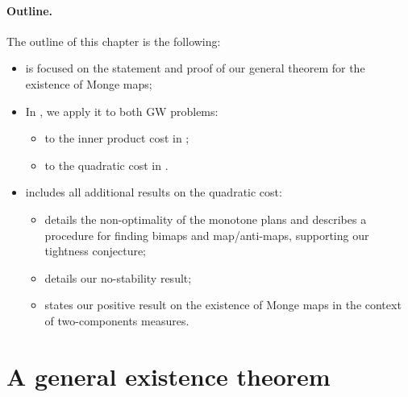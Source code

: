 \paragraph{Outline.}
The outline of this chapter is the following:
\begin{itemize}
    \item {} is focused on the statement and proof of our general theorem for the existence of Monge maps;
    \item In , we apply it to both GW problems: \begin{itemize}[nolistsep]
        \item to the inner product cost in ;
        \item to the quadratic cost in .
    \end{itemize}
    \item {} includes all additional results on the quadratic cost: \begin{itemize}[nolistsep]
        \item {} details the non-optimality of the monotone plans and describes a procedure for finding bimaps and map/anti-maps, supporting our tightness conjecture;
        \item {} details our no-stability result;
        \item {} states our positive result on the existence of Monge maps in the context of two-components measures.
    \end{itemize}
\end{itemize}

    \section{A general existence theorem}
    \label{sec:general-theo}

